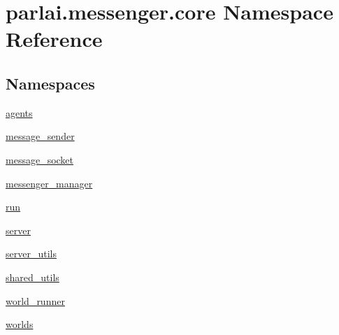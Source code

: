 \hypertarget{namespaceparlai_1_1messenger_1_1core}{}\section{parlai.\+messenger.\+core Namespace Reference}
\label{namespaceparlai_1_1messenger_1_1core}
\subsection*{Namespaces}
\begin{DoxyCompactItemize}
\item 
 \hyperlink{namespaceparlai_1_1messenger_1_1core_1_1agents}{agents}
\item 
 \hyperlink{namespaceparlai_1_1messenger_1_1core_1_1message__sender}{message\+\_\+sender}
\item 
 \hyperlink{namespaceparlai_1_1messenger_1_1core_1_1message__socket}{message\+\_\+socket}
\item 
 \hyperlink{namespaceparlai_1_1messenger_1_1core_1_1messenger__manager}{messenger\+\_\+manager}
\item 
 \hyperlink{namespaceparlai_1_1messenger_1_1core_1_1run}{run}
\item 
 \hyperlink{namespaceparlai_1_1messenger_1_1core_1_1server}{server}
\item 
 \hyperlink{namespaceparlai_1_1messenger_1_1core_1_1server__utils}{server\+\_\+utils}
\item 
 \hyperlink{namespaceparlai_1_1messenger_1_1core_1_1shared__utils}{shared\+\_\+utils}
\item 
 \hyperlink{namespaceparlai_1_1messenger_1_1core_1_1world__runner}{world\+\_\+runner}
\item 
 \hyperlink{namespaceparlai_1_1messenger_1_1core_1_1worlds}{worlds}
\end{DoxyCompactItemize}
